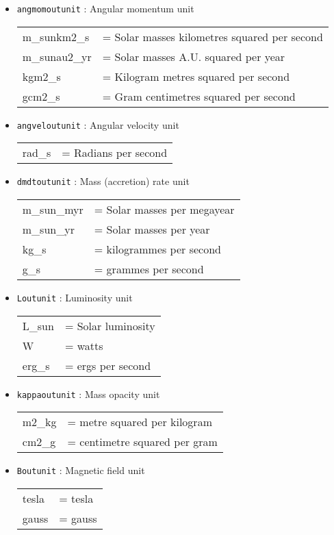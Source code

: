 \documentclass[a4paper]{article}
\newcommand{\var}[1]{\texttt{#1}}
\begin{document}
\begin{itemize}
\item \var{angmomoutunit} : Angular momentum unit \\
\begin{tabular}{ll}
m\_sunkm2\_s  & = Solar masses kilometres squared per second \\
m\_sunau2\_yr & = Solar masses A.U. squared per year \\
kgm2\_s       & = Kilogram metres squared per second \\
gcm2\_s       & = Gram centimetres squared per second
\end{tabular}

\item \var{angveloutunit} : Angular velocity unit \\
\begin{tabular}{ll}
rad\_s & = Radians per second
\end{tabular}

\item \var{dmdtoutunit} : Mass (accretion) rate unit \\
\begin{tabular}{ll}
m\_sun\_myr  & = Solar masses per megayear \\
m\_sun\_yr   & = Solar masses per year \\
kg\_s        & = kilogrammes per second \\
g\_s         & = grammes per second
\end{tabular}

\item \var{Loutunit} : Luminosity unit \\
\begin{tabular}{ll}
L\_sun       & = Solar luminosity \\
W            & = watts \\
erg\_s       & = ergs per second
\end{tabular}

\item \var{kappaoutunit} : Mass opacity unit \\
\begin{tabular}{ll}
m2\_kg       & = metre squared per kilogram \\
cm2\_g       & = centimetre squared per gram
\end{tabular}

\item \var{Boutunit} : Magnetic field unit \\
\begin{tabular}{ll}
tesla     & = tesla \\
gauss     & = gauss
\end{tabular}


\end{itemize}
\end{document}
